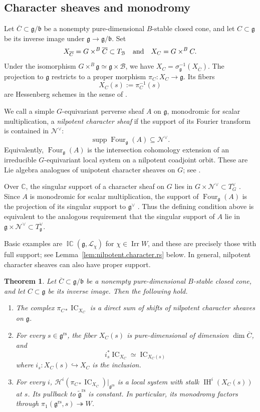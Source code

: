 \documentclass[11pt]{amsart}
\numberwithin{equation}{section}
\newtheorem{theorem}{Theorem}[section]
\theoremstyle{definition}
\newcommand\grs{\mathfrak{g}^{\mathrm{rs}}}
\newcommand\tgrs{\widetilde{\mathfrak{g}}^{\mathrm{rs}}}
\def\and{\quad{\rm and}\quad}
\DeclareMathOperator{\Irr}{\mathrm{Irr}}
\DeclareMathOperator{\supp}{\mathrm{supp}}
\DeclareMathOperator{\IC}{\mathrm{IC}}
\DeclareMathOperator{\ICperv}{\mathbb{IC}}
\DeclareMathOperator{\Four}{Four}
\def\cB{\mathcal {B}}
\def\C{\mathbb{C}}
\def\fg{\mathfrak {g}}
\def\fb{\mathfrak {b}}
\DeclareMathOperator{\IH}{\mathrm{IH}}
\begin{document}
\subsection{Character sheaves and monodromy}
\label{ss:nonlinear.support}

Let $\overline C\subset\fg/\fb$ be a nonempty pure-dimensional $B$-stable closed cone, and let $C\subset\fg$ be its inverse image under $\fg\to\fg/\fb$.
Set
\[
X_{\overline C}=G\times^B\overline C\subset T_{\cB} \and X_{C}=G\times^BC.
\]
Under the isomorphism $G\times^B\fg\simeq\fg\times\cB$, we have $X_{C}=\sigma_\fg^{-1}(X_{\overline C})$.
The projection to $\fg$ restricts to a proper morphism $\pi_{C}:X_{C}\to\fg$.
Its fibers
\[X_{C}(s):=\pi_{C}^{-1}(s)\]
are Hessenberg schemes in the sense of \cite[Definition~5.1]{BHL25}.


We call a simple $G$-equivariant perverse sheaf $A$ on $\fg$, monodromic for scalar multiplication, a \emph{nilpotent character sheaf} if the support of its Fourier transform is contained in $\mathcal N^\vee$:
\[
\supp\Four_\fg(A)\subseteq\mathcal N^\vee.
\]
Equivalently, $\Four_\fg(A)$ is the intersection cohomology extension of an irreducible $G$-equivariant local system on a nilpotent coadjoint orbit.
These are Lie algebra analogues of unipotent character sheaves on $G$; see \cite[Section~2]{AHJR-overview}.

Over $\C$, the singular support of a character sheaf on $G$ lies in $G\times\mathcal N^\vee\subset T_G^\vee$ \cite[Theorem~4.4]{MV88}.
Since $A$ is monodromic for scalar multiplication, the support of $\Four_\fg(A)$ is the projection of its singular support to $\fg^\vee$ \cite[Theorem~5.5.5]{KS94}.
Thus the defining condition above is equivalent to the analogous requirement that the singular support of $A$ lie in $\fg\times\mathcal N^\vee\subset T_\fg^\vee$.

Basic examples are $\ICperv(\fg,\mathcal L_\chi)$ for $\chi\in\Irr W$, and these are precisely those with full support; see Lemma~\ref{lem:nilpotent.character.rs} below.
In general, nilpotent character sheaves can also have proper support.



\begin{theorem}\label{thm:cone.character}
Let $\overline C\subset\fg/\fb$ be a nonempty pure-dimensional $B$-stable closed cone, and let $C\subset\fg$ be its inverse image.
Then the following hold.
\begin{enumerate}
\item The complex $\pi_{C*}\IC_{X_C}$ is a direct sum of shifts of nilpotent character sheaves on $\fg$.
\item For every $s\in\grs$, the fiber $X_C(s)$ is pure-dimensional of dimension $\dim\overline C$, and
\[
i_s^*\IC_{X_C}\simeq\IC_{X_C(s)}
\]
where $i_s:X_C(s)\hookrightarrow X_C$ is the inclusion.
\item For every $i$, $\mathcal H^i(\pi_{C*}\IC_{X_C})|_{\grs}$ is a local system with stalk $\IH^i(X_C(s))$ at $s$.
Its pullback to $\tgrs$ is constant.
In particular, its monodromy factors through $\pi_1(\grs,s)\twoheadrightarrow W$.
\end{enumerate}
\end{theorem}
\end{document}
